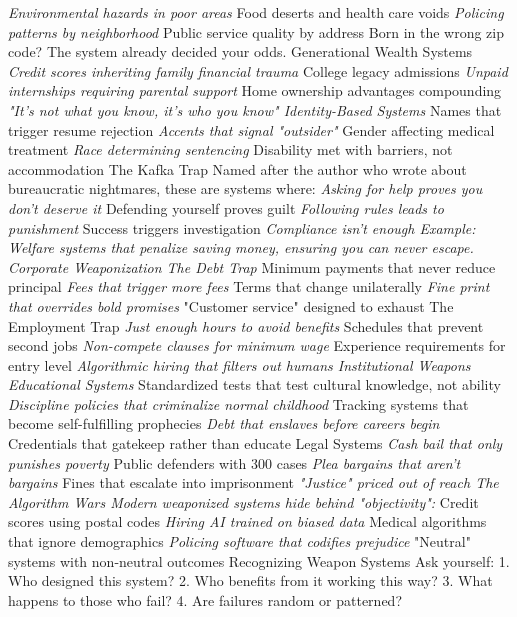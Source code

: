 \documentclass[12pt]{book}
\begin{document}
\textit{ Environmental hazards in poor areas
} Food deserts and health care voids
\textit{ Policing patterns by neighborhood
} Public service quality by address
Born in the wrong zip code? The system already decided your odds.
Generational Wealth Systems
\textit{ Credit scores inheriting family financial trauma
} College legacy admissions
\textit{ Unpaid internships requiring parental support
} Home ownership advantages compounding
\textit{ "It's not what you know, it's who you know"
Identity-Based Systems
} Names that trigger resume rejection
\textit{ Accents that signal "outsider"
} Gender affecting medical treatment
\textit{ Race determining sentencing
} Disability met with barriers, not accommodation
The Kafka Trap
Named after the author who wrote about bureaucratic nightmares, these are systems where:
\textit{ Asking for help proves you don't deserve it
} Defending yourself proves guilt
\textit{ Following rules leads to punishment
} Success triggers investigation
\textit{ Compliance isn't enough
Example: Welfare systems that penalize saving money, ensuring you can never escape.
Corporate Weaponization
The Debt Trap
} Minimum payments that never reduce principal
\textit{ Fees that trigger more fees
} Terms that change unilaterally
\textit{ Fine print that overrides bold promises
} "Customer service" designed to exhaust
The Employment Trap
\textit{ Just enough hours to avoid benefits
} Schedules that prevent second jobs
\textit{ Non-compete clauses for minimum wage
} Experience requirements for entry level
\textit{ Algorithmic hiring that filters out humans
Institutional Weapons
Educational Systems
} Standardized tests that test cultural knowledge, not ability
\textit{ Discipline policies that criminalize normal childhood
} Tracking systems that become self-fulfilling prophecies
\textit{ Debt that enslaves before careers begin
} Credentials that gatekeep rather than educate
Legal Systems
\textit{ Cash bail that only punishes poverty
} Public defenders with 300 cases
\textit{ Plea bargains that aren't bargains
} Fines that escalate into imprisonment
\textit{ "Justice" priced out of reach
The Algorithm Wars
Modern weaponized systems hide behind "objectivity":
} Credit scores using postal codes
\textit{ Hiring AI trained on biased data
} Medical algorithms that ignore demographics
\textit{ Policing software that codifies prejudice
} "Neutral" systems with non-neutral outcomes
Recognizing Weapon Systems
Ask yourself:
1. Who designed this system?
2. Who benefits from it working this way?
3. What happens to those who fail?
4. Are failures random or patterned?
\end{document}
